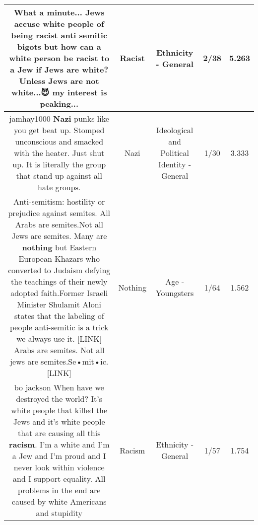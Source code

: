 \documentclass[11pt]{article}
\newlength\mylength
\begin{document}
\begin{center}
\begin{longtable}{|C{.65\mylength}|C{.30\mylength}|C{.12\mylength}|C{.12\mylength}|C{.12\mylength}|}
  \small What a minute... Jews accuse white people of being \textbf{racist} anti semitic bigots but how can a white person be \textbf{racist} to a Jew if Jews are white? Unless Jews are not white...😈 my interest is peaking...\normalsize   & Racist & Ethnicity - General & 2/38 & 5.263 \\  \hline
  \small jamhay1000 \textbf{Nazi} punks like you get beat up. Stomped unconscious and smacked with the heater. Just shut up. It is literally the group that stand up against all hate groups.\normalsize   & Nazi &  Ideological and Political Identity - General & 1/30 & 3.333 \\  \hline
  \small Anti-semitism: hostility or prejudice against semites. All Arabs are semites.Not all Jews are semites. Many are \textbf{nothing} but Eastern European Khazars who converted to Judaism defying the teachings of their newly adopted faith.Former Israeli Minister Shulamit Aloni states that the labeling of people anti-semitic is a trick we always use it. [LINK] Arabs are semites. Not all jews are semites.Se•mit•ic.  [LINK] \normalsize   & Nothing & Age - Youngsters & 1/64 & 1.562 \\  \hline
  \small bo jackson When have we destroyed the world? It's white people that killed the Jews and it's white people that are causing all this \textbf{racism}. I'm a white and I'm a Jew and I'm proud and I never look within violence and I support equality. All problems in the end are caused by white Americans and stupidity\normalsize   & Racism & Ethnicity - General & 1/57 & 1.754 \\  \hline

\end{longtable}
\end{center}
\end{document}
